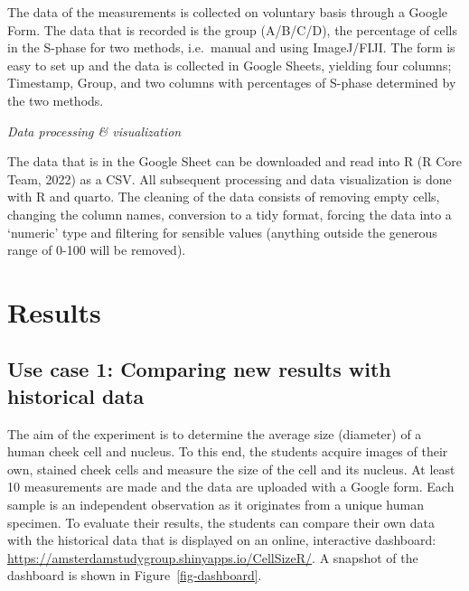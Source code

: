 \documentclass[
]{agujournal2019}
\begin{document}
The data of the measurements is collected on voluntary basis through a
Google Form. The data that is recorded is the group (A/B/C/D), the
percentage of cells in the S-phase for two methods, i.e.~manual and
using ImageJ/FIJI. The form is easy to set up and the data is collected
in Google Sheets, yielding four columns; Timestamp, Group, and two
columns with percentages of S-phase determined by the two methods.

\emph{Data processing \& visualization}

The data that is in the Google Sheet can be downloaded and read into R
(R Core Team, 2022) as a CSV. All subsequent processing and data
visualization is done with R and quarto. The cleaning of the data
consists of removing empty cells, changing the column names, conversion
to a tidy format, forcing the data into a `numeric' type and filtering
for sensible values (anything outside the generous range of 0-100 will
be removed).

\hypertarget{sec-results}{%
\section*{Results}\label{sec-results}}

\hypertarget{use-case-1-comparing-new-results-with-historical-data}{%
\subsection*{Use case 1: Comparing new results with historical
data}\label{use-case-1-comparing-new-results-with-historical-data}}

The aim of the experiment is to determine the average size (diameter) of
a human cheek cell and nucleus. To this end, the students acquire images
of their own, stained cheek cells and measure the size of the cell and
its nucleus. At least 10 measurements are made and the data are uploaded
with a Google form. Each sample is an independent observation as it
originates from a unique human specimen. To evaluate their results, the
students can compare their own data with the historical data that is
displayed on an online, interactive dashboard:
\url{https://amsterdamstudygroup.shinyapps.io/CellSizeR/}. A snapshot of
the dashboard is shown in Figure~\ref{fig-dashboard}.
\end{document}
